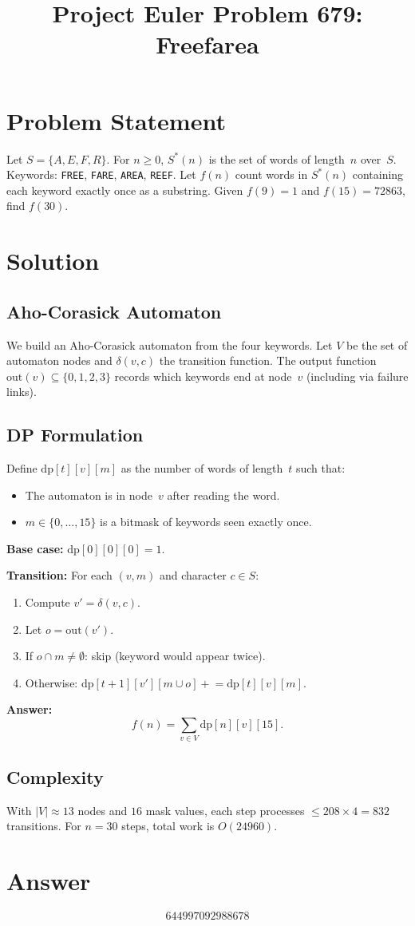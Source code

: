 \documentclass[12pt]{article}
\title{Project Euler Problem 679: Freefarea}
\author{}
\date{}
\begin{document}
\maketitle

\section{Problem Statement}
Let $S=\{A,E,F,R\}$. For $n\ge 0$, $S^*(n)$ is the set of words of length~$n$ over~$S$.
Keywords: \texttt{FREE}, \texttt{FARE}, \texttt{AREA}, \texttt{REEF}.
Let $f(n)$ count words in $S^*(n)$ containing each keyword exactly once as a substring.
Given $f(9)=1$ and $f(15)=72863$, find $f(30)$.

\section{Solution}

\subsection{Aho-Corasick Automaton}
We build an Aho-Corasick automaton from the four keywords. Let $V$ be the set of automaton nodes and $\delta(v,c)$ the transition function. The output function $\mathrm{out}(v)\subseteq\{0,1,2,3\}$ records which keywords end at node~$v$ (including via failure links).

\subsection{DP Formulation}
Define $\mathrm{dp}[t][v][m]$ as the number of words of length~$t$ such that:
\begin{itemize}
  \item The automaton is in node~$v$ after reading the word.
  \item $m\in\{0,\ldots,15\}$ is a bitmask of keywords seen exactly once.
\end{itemize}

\textbf{Base case:} $\mathrm{dp}[0][0][0] = 1$.

\textbf{Transition:} For each $(v,m)$ and character $c\in S$:
\begin{enumerate}
  \item Compute $v' = \delta(v,c)$.
  \item Let $o = \mathrm{out}(v')$.
  \item If $o \cap m \ne \emptyset$: skip (keyword would appear twice).
  \item Otherwise: $\mathrm{dp}[t+1][v'][m\cup o] \mathrel{+}= \mathrm{dp}[t][v][m]$.
\end{enumerate}

\textbf{Answer:}
\[
  f(n) = \sum_{v\in V} \mathrm{dp}[n][v][15].
\]

\subsection{Complexity}
With $|V|\approx 13$ nodes and $16$ mask values, each step processes $\le 208\times 4 = 832$ transitions.
For $n=30$ steps, total work is $O(24960)$.

\section{Answer}

\[
\boxed{644997092988678}
\]
\end{document}

